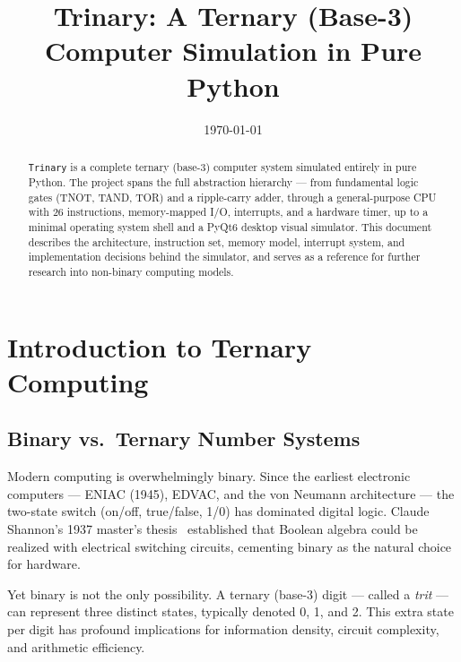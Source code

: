 \documentclass[11pt,a4paper]{article}
\title{Trinary: A Ternary (Base-3) Computer Simulation in Pure Python}
\author{}
\date{\today}
\newcommand{\trinary}{\texttt{Trinary}}
\begin{document}
\maketitle
\thispagestyle{empty}

\begin{abstract}
\trinary{} is a complete ternary (base-3) computer system simulated entirely in
pure Python. The project spans the full abstraction hierarchy --- from
fundamental logic gates (TNOT, TAND, TOR) and a ripple-carry adder, through a
general-purpose CPU with 26 instructions, memory-mapped I/O, interrupts, and a
hardware timer, up to a minimal operating system shell and a PyQt6 desktop
visual simulator. This document describes the architecture, instruction set,
memory model, interrupt system, and implementation decisions behind the
simulator, and serves as a reference for further research into non-binary
computing models.
\end{abstract}

\tableofcontents
\clearpage

\section{Introduction to Ternary Computing}
\label{sec:introduction}

\subsection{Binary vs.\ Ternary Number Systems}

Modern computing is overwhelmingly binary.  Since the earliest electronic
computers --- ENIAC (1945), EDVAC, and the von Neumann architecture --- the
two-state switch (on/off, true/false, 1/0) has dominated digital logic.
Claude Shannon's 1937 master's thesis~\cite{shannon1937relay} established
that Boolean algebra could be realized with electrical switching circuits,
cementing binary as the natural choice for hardware.

Yet binary is not the only possibility.  A ternary (base-3) digit --- called
a \emph{trit} --- can represent three distinct states, typically denoted
0, 1, and 2.  This extra state per digit has profound implications for
information density, circuit complexity, and arithmetic efficiency.
\end{document}
